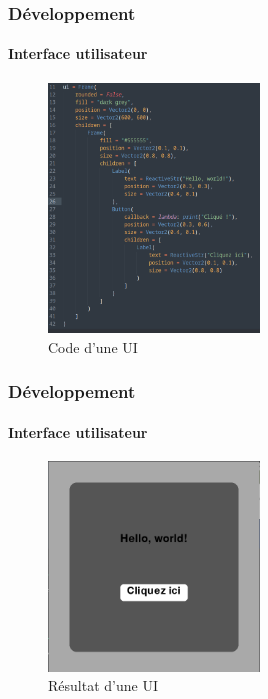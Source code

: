 \begin{frame}
	\frametitle{Développement}
	\framesubtitle{Interface utilisateur}
	\begin{figure}
		\includegraphics[width=0.5\textwidth]{img/code_ui.png}
		\caption{Code d'une UI}
	\end{figure}
\end{frame}
\begin{frame}
	\frametitle{Développement}
	\framesubtitle{Interface utilisateur}
	\begin{figure}
		\includegraphics[width=0.5\textwidth]{img/ui.png}
		\caption{Résultat d'une UI}
	\end{figure}

\end{frame}